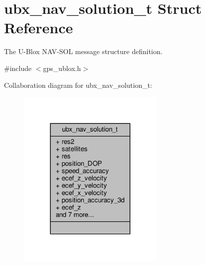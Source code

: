 \hypertarget{structubx__nav__solution__t}{\section{ubx\+\_\+nav\+\_\+solution\+\_\+t Struct Reference}
\label{structubx__nav__solution__t}
}


The U-\/\+Blox N\+A\+V-\/\+S\+O\+L message structure definition.  




{\ttfamily \#include $<$gps\+\_\+ublox.\+h$>$}



Collaboration diagram for ubx\+\_\+nav\+\_\+solution\+\_\+t\+:
\nopagebreak
\begin{figure}[H]
\begin{center}
\leavevmode
\includegraphics[width=200pt]{structubx__nav__solution__t__coll__graph}
\end{center}
\end{figure}
